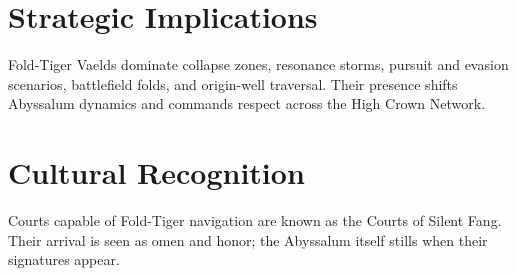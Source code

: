 \section{Strategic Implications}
Fold-Tiger Vaelds dominate collapse zones, resonance storms, pursuit and evasion scenarios, battlefield folds, and origin-well traversal. Their presence shifts Abyssalum dynamics and commands respect across the High Crown Network.

\section{Cultural Recognition}
Courts capable of Fold-Tiger navigation are known as the Courts of Silent Fang. Their arrival is seen as omen and honor; the Abyssalum itself stills when their signatures appear.

